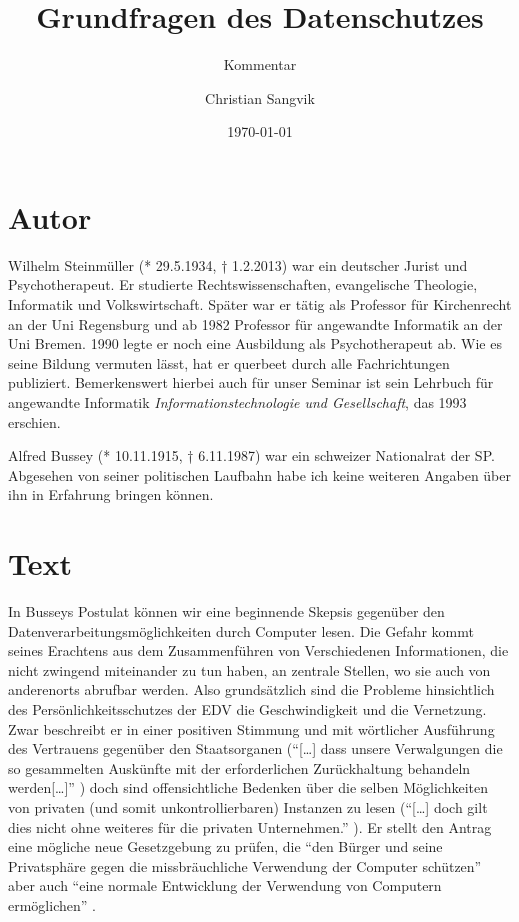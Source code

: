 \documentclass[a4paper,ngerman,11pt]{scrartcl}
\subtitle{Kommentar}
\author{Christian Sangvik}
\date{\today}
\title{Grundfragen des Datenschutzes}
\begin{document}
\maketitle

\section{Autor}
\label{sec-1}

Wilhelm Steinmüller (* 29.5.1934, † 1.2.2013) war ein deutscher Jurist und
Psychotherapeut. Er studierte Rechtswissenschaften, evangelische Theologie,
Informatik und Volkswirtschaft. Später war er tätig als Professor für
Kirchenrecht an der Uni Regensburg und ab 1982 Professor für angewandte
Informatik an der Uni Bremen. 1990 legte er noch eine Ausbildung als
Psychotherapeut ab.\cite{wiki:Steinmueller-de} Wie es seine Bildung vermuten
lässt, hat er querbeet durch alle Fachrichtungen publiziert. Bemerkenswert
hierbei auch für unser Seminar ist sein Lehrbuch für angewandte Informatik
\emph{Informationstechnologie und Gesellschaft}, das 1993
erschien.\cite{wiki:Steinmueller-de}

Alfred Bussey (* 10.11.1915, † 6.11.1987) war ein schweizer Nationalrat der
SP.\cite{wiki:Bussey-de} Abgesehen von seiner politischen Laufbahn habe ich
keine weiteren Angaben über ihn in Erfahrung bringen können.

\section{Text}
\label{sec-2}

In Busseys Postulat können wir eine beginnende Skepsis gegenüber den
Datenverarbeitungsmöglichkeiten durch Computer lesen. Die Gefahr kommt seines
Erachtens aus dem Zusammenführen von Verschiedenen Informationen, die nicht
zwingend miteinander zu tun haben, an zentrale Stellen, wo sie auch von
anderenorts abrufbar werden. Also grundsätzlich sind die Probleme hinsichtlich
des Persönlichkeitsschutzes der EDV die Geschwindigkeit und die Vernetzung.
Zwar beschreibt er in einer positiven Stimmung und mit wörtlicher Ausführung
des Vertrauens gegenüber den Staatsorganen (``[\ldots{}] dass unsere Verwalgungen
die so gesammelten Auskünfte mit der erforderlichen Zurückhaltung behandeln
werden[\ldots{}]'' \cite{Computer1972}) doch sind offensichtliche Bedenken über die
selben Möglichkeiten von privaten (und somit unkontrollierbaren) Instanzen zu
lesen (``[\ldots{}] doch gilt dies nicht ohne weiteres für die privaten
Unternehmen.'' \cite{Computer1972}). Er stellt den Antrag eine mögliche neue
Gesetzgebung zu prüfen, die ``den Bürger und seine Privatsphäre gegen die
missbräuchliche Verwendung der Computer schützen'' \cite{Computer1972} aber auch
``eine normale Entwicklung der Verwendung von Computern ermöglichen''
\cite{Computer1972}.
\end{document}
